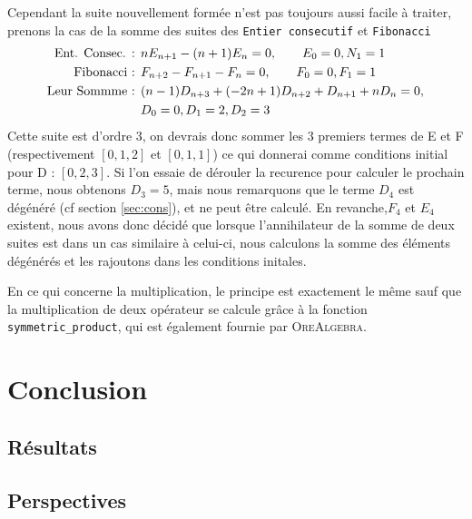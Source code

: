 \documentclass[12pt]{article}
\begin{document}
        \par Cependant la suite nouvellement formée n'est pas toujours aussi facile à traiter, prenons la cas
        de la somme des suites des  \texttt{Entier consecutif} et \texttt{Fibonacci}
        \begin{align*}
            \textnormal{Ent. Consec. : } &nE_{n+1} - (n+1)E_n = 0,\qquad E_0 = 0, N_1 = 1\\
            \textnormal{Fibonacci : } &F_{n+2} - F_{n+1} - F_n = 0,\qquad F_0=0, F_1=1\\
            \textnormal{Leur Sommme : } &(n - 1)D_{n+3} + (-2n + 1)D_{n+2} + D_{n+1} + nD_n = 0, \\
            &D_0 = 0, D_1 = 2, D_2 = 3\\
        \end{align*} 
        Cette suite est d'ordre 3, on devrais donc sommer les 3 premiers termes de E et F (respectivement 
        $[0,1,2]$ et $[0,1,1]$) ce qui donnerai comme conditions initial pour D : $[0,2,3]$.
        Si 
        l'on essaie de dérouler la recurence pour calculer le prochain terme, nous obtenons $D_3 = 5$,
        mais nous remarquons que le terme $D_4$ est dégénéré (cf section \ref{sec:cons}), et ne peut 
        être calculé. En revanche,$F_4$ et $E_4$ existent, nous avons donc décidé que lorsque l'annihilateur
        de la somme de deux suites est dans un cas similaire à celui-ci, nous calculons la somme des
        éléments dégénérés et les rajoutons dans les conditions initales.
        \par En ce qui concerne la multiplication, le principe est exactement le même sauf que la 
        multiplication de deux opérateur se calcule grâce à la fonction \texttt{symmetric\_product},
        qui est également fournie par \textsc{OreAlgebra}.

\setcounter{secnumdepth}{0}
\section{Conclusion}
    \subsection{Résultats}
    \subsection{Perspectives}
       

\end{document}
